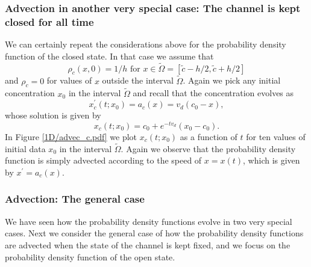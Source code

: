 

\subsubsection{Advection in another very special case: The channel is kept closed for all time}

We can certainly repeat the considerations above for the probability density function of the closed state. In that case we assume that
\begin{equation}
 \rho_c (x,0)=1/h \text{ for } x\in \tilde{\Omega} = [\tilde{c}-h/2,\tilde{c}+h/2 ]  \label{closed_advec}
  \end{equation}
and $\rho_c=0$ for values of $x$ outside the interval $\tilde{\Omega}$. Again we pick any initial concentration $x_0$ in the interval
$\tilde{\Omega}$ and recall that the concentration evolves as
\begin{equation}
x^{\prime}_c(t;x_0)=a_c(x)=v_{d}\left(c_{0}-x\right), \label{adv_ode_closed}
\end{equation}
whose solution is given by 
\[
x_c(t;x_0)=c_{0}+e^{-t v_{d}}\left(  x_{0}-c_{0}\right).
\]
In Figure \ref{1D/advec_c.pdf} we plot $x_c(t;x_0)$ as a function of $t$ for ten values of initial data $x_0$ in the interval $\tilde{\Omega}$. Again we observe that the probability density function is simply advected according to 
 the speed of $x=x(t)$, which is given by $x^{\prime}=a_c(x)$.


\subsubsection{Advection: The general case}

We have seen how the probability density functions evolve in two very special cases. Next we consider the general case of how the probability density functions are advected when the state of the channel is kept fixed, and we focus on the probability density function of the open state.

